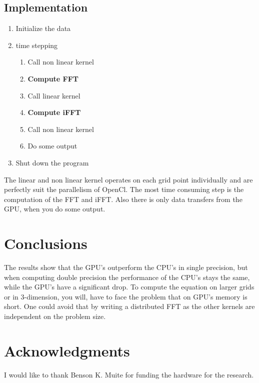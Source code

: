 \documentclass{sig-alternate-05-2015}
\begin{document}
\subsection{Implementation}
\begin{enumerate}
\item Initialize the data
\item time stepping
\begin{enumerate}
\item Call non linear kernel
\item {\bf Compute FFT }\cite{clFFT}
\item Call linear kernel
\item {\bf Compute iFFT }
\item Call non linear kernel
\item Do some output
\end{enumerate}
\item Shut down the program
\end{enumerate}
The linear and non linear kernel operates on each grid point individually and are perfectly suit the parallelism of OpenCl. The most time consuming step is the computation of the FFT and iFFT. Also there is only data transfers from the GPU, when you do some output.



\section{Conclusions}
The results show that the GPU's outperform the CPU's in single precision, but when computing double precision the performance of the CPU's stays the same, while the GPU's have a significant drop. To compute the equation on larger grids or in 3-dimension, you will, have to face the problem that on GPU's memory is short. One could avoid that by writing a distributed FFT as the other kernels are independent on the problem size. 


\section{Acknowledgments}
I would like to thank Benson  {{K}}. Muite  for funding the hardware for the research.
\end{document}
